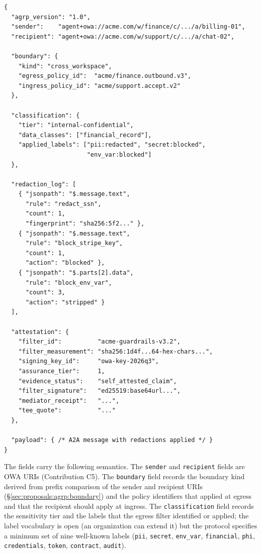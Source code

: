\begin{verbatim}
{
  "agrp_version": "1.0",
  "sender":    "agent+owa://acme.com/w/finance/c/.../a/billing-01",
  "recipient": "agent+owa://acme.com/w/support/c/.../a/chat-02",

  "boundary": {
    "kind": "cross_workspace",
    "egress_policy_id":  "acme/finance.outbound.v3",
    "ingress_policy_id": "acme/support.accept.v2"
  },

  "classification": {
    "tier": "internal-confidential",
    "data_classes": ["financial_record"],
    "applied_labels": ["pii:redacted", "secret:blocked",
                       "env_var:blocked"]
  },

  "redaction_log": [
    { "jsonpath": "$.message.text",
      "rule": "redact_ssn",
      "count": 1,
      "fingerprint": "sha256:5f2..." },
    { "jsonpath": "$.message.text",
      "rule": "block_stripe_key",
      "count": 1,
      "action": "blocked" },
    { "jsonpath": "$.parts[2].data",
      "rule": "block_env_var",
      "count": 3,
      "action": "stripped" }
  ],

  "attestation": {
    "filter_id":          "acme-guardrails-v3.2",
    "filter_measurement": "sha256:1d4f...64-hex-chars...",
    "signing_key_id":     "owa-key-2026q3",
    "assurance_tier":     1,
    "evidence_status":    "self_attested_claim",
    "filter_signature":   "ed25519:base64url...",
    "mediator_receipt":   "...",
    "tee_quote":          "..."
  },

  "payload": { /* A2A message with redactions applied */ }
}
\end{verbatim}

The fields carry the following semantics. The
\texttt{sender} and \texttt{recipient} fields are OWA
URIs (Contribution C5). The \texttt{boundary} field
records the boundary kind derived from prefix comparison
of the sender and recipient URIs
(\S\ref{sec:proposals:agrp:boundary}) and the policy
identifiers that applied at egress and that the
recipient should apply at ingress. The
\texttt{classification} field records the
sensitivity tier and the labels that the egress filter
identified or applied; the label vocabulary is open
(an organization can extend it) but the protocol
specifies a minimum set of nine well-known labels
(\texttt{pii}, \texttt{secret}, \texttt{env\_var},
\texttt{financial}, \texttt{phi}, \texttt{credentials},
\texttt{token}, \texttt{contract}, \texttt{audit}).

